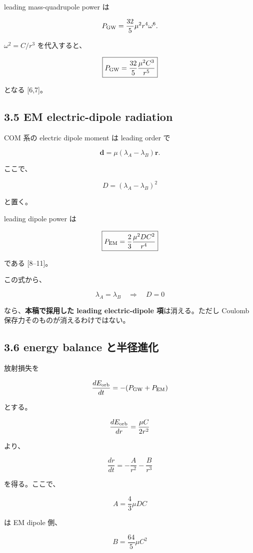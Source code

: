\documentclass[
  a4paper,
]{ltjsarticle}
\begin{document}
leading mass-quadrupole power は

\[
P_{\rm GW}
=
\frac{32}{5}\mu^2 r^4\omega^6.
\]

\(\omega^2=C/r^3\) を代入すると、

\[
\boxed{
P_{\rm GW}
=
\frac{32}{5}
\frac{\mu^2C^3}{r^5}
}
\]

となる {[}6,7{]}。

\subsection{3.5 EM electric-dipole
radiation}\label{em-electric-dipole-radiation}

COM 系の electric dipole moment は leading order で

\[
\mathbf d
=
\mu(\lambda_A-\lambda_B)\mathbf r.
\]

ここで、

\[
\boxed{
D=(\lambda_A-\lambda_B)^2
}
\]

と置く。

leading dipole power は

\[
\boxed{
P_{\rm EM}
=
\frac23
\frac{\mu^2 D C^2}{r^4}
}
\]

である {[}8--11{]}。

この式から、

\[
\lambda_A=\lambda_B
\quad\Longrightarrow\quad
D=0
\]

なら、\textbf{本稿で採用した leading electric-dipole 項}は消える。ただし
Coulomb 保存力そのものが消えるわけではない。

\subsection{3.6 energy balance
と半径進化}\label{energy-balance-ux3068ux534aux5f84ux9032ux5316}

放射損失を

\[
\frac{dE_{\rm orb}}{dt}
=-(P_{\rm GW}+P_{\rm EM})
\]

とする。

\[
\frac{dE_{\rm orb}}{dr}
=
\frac{\mu C}{2r^2}
\]

より、

\[
\boxed{
\frac{dr}{dt}
=-\frac{A}{r^2}-\frac{B}{r^3}
}
\]

を得る。ここで、

\[
\boxed{
A=\frac43\mu D C
}
\]

は EM dipole 側、

\[
\boxed{
B=\frac{64}{5}\mu C^2
}
\]
\end{document}
